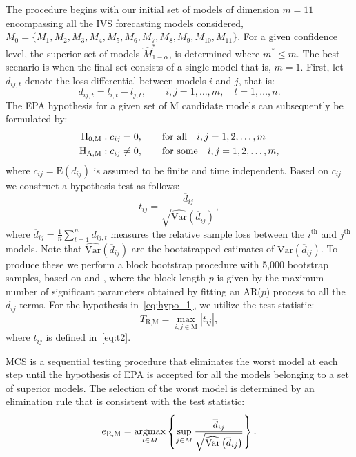 \documentclass[12pt,a4paper]{article}
\newcommand{\argmax}{\operatornamewithlimits{argmax}}
\begin{document}
The procedure begins with our initial set of models of dimension $m=11$ encompassing all the IVS forecasting models considered, $M_0 = \{M_1, M_2, M_3, M_4, M_5, M_6, M_7, M_8, M_9, M_{10}, M_{11}\}$. For a given confidence level, the superior set of models $\widehat{M}_{1-\alpha}^*$, is determined where $m^*\leq m$. The best scenario is when the final set consists of a single model that is, $m=1$. First, let $d_{ij,t}$ denote the loss differential between models $i$ and $j$, that is:
\begin{equation*}
d_{ij,t} = l_{i,t} - l_{j,t}, \qquad i,j=1,\dots,m, \quad t=1,\dots,n.
\end{equation*} 
The EPA hypothesis for a given set of $\text{M}$ candidate models can subsequently be formulated by:
\begin{align}
\text{H}_{\text{0,M}}: c_{ij}&=0, \qquad \text{for all}\quad i, j = 1,2,\dots,m\notag\\
\text{H}_{\text{A,M}}: c_{ij}&\neq 0, \qquad \text{for some}\quad i, j = 1,2,\dots,m,\label{eq:hypo_1}
\end{align}
where $c_{ij} = \text{E}(d_{ij})$ is assumed to be finite and time independent. Based on $c_{ij}$ we construct a hypothesis test as follows:
\begin{equation}
t_{ij} = \frac{\overline{d}_{ij}}{\sqrt{\widehat{\text{Var}}\left(\overline{d}_{ij}\right)}}, \label{eq:t2} 
\end{equation}
where $\overline{d}_{ij} =\frac{1}{n}\sum^n_{t=1}d_{ij,t}$ measures the relative sample loss between the $i^{\text{th}}$ and $j^{\text{th}}$ models. Note that $\widehat{\text{Var}}\left(\overline{d}_{ij}\right)$ are the bootstrapped estimates of $\text{Var}\left(\overline{d}_{ij}\right)$. To produce these we perform a block bootstrap procedure with 5,000 bootstrap samples, based on \cite{HLN11} and \cite{BC15}, where the block length $p$ is given by the maximum number of significant parameters obtained by fitting an AR($p$) process to all the $d_{ij}$ terms. For the hypothesis in~\eqref{eq:hypo_1}, we utilize the test statistic:
\begin{equation}
T_{\text{R,M}} = \max_{i,j\in \text{M}}|t_{ij}|,\label{eq:MCS_1}
\end{equation} 
where $t_{ij}$ is defined in~\eqref{eq:t2}.
 
MCS is a sequential testing procedure that eliminates the worst model at each step until the hypothesis of EPA is accepted for all the models belonging to a set of superior models. The selection of the worst model is determined by an elimination rule that is consistent with the test statistic:
\begin{equation*}
e_{\text{R,M}} = \argmax_{i\in M}\left\{\sup_{j\in M}\frac{\overline{d}_{ij}}{\sqrt{\widehat{\text{Var}}\left(\overline{d}_{ij}\right)}}\right\}.
\end{equation*}
\end{document}
